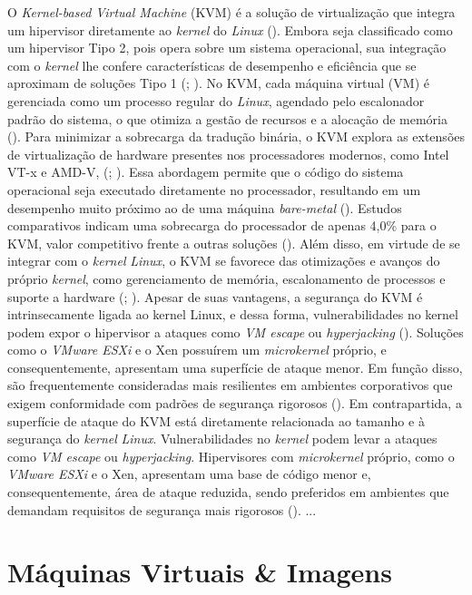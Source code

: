 \begin{itemize}
O \textit{Kernel-based Virtual Machine} (KVM) é a solução de virtualização que integra um hipervisor diretamente ao \textit{kernel} do \textit{Linux} (\cite{carissimi2008}). Embora seja classificado como um hipervisor Tipo 2, pois opera sobre um sistema operacional, sua integração com o \textit{kernel} lhe confere características de desempenho e eficiência que se aproximam de soluções Tipo 1 (\cite{chawla2025}; \cite{kominos2017}). No KVM, cada máquina virtual (VM) é gerenciada como um processo regular do \textit{Linux}, agendado pelo escalonador padrão do sistema, o que otimiza a gestão de recursos e a alocação de memória (\cite{anand2013}).
Para minimizar a sobrecarga da tradução binária, o KVM explora as extensões de virtualização de hardware presentes nos processadores modernos, como Intel VT-x e AMD-V, (\cite{chawla2025}; \cite{carissimi2008}). Essa abordagem permite que o código do sistema operacional seja executado diretamente no processador, resultando em um desempenho muito próximo ao de uma máquina \textit{bare-metal} (\cite{kominos2017}). Estudos comparativos indicam uma sobrecarga do processador de apenas 4,0\% para o KVM, valor competitivo frente a outras soluções (\cite{chawla2025}). Além disso, em virtude de se integrar com o \textit{kernel} \textit{Linux}, o KVM se favorece das otimizações e avanços do próprio \textit{kernel}, como gerenciamento de memória, escalonamento de processos e suporte a hardware (\cite{anand2013}; \cite{arora2014}).
Apesar de suas vantagens, a segurança do KVM é intrinsecamente ligada ao kernel Linux, e dessa forma, vulnerabilidades no kernel podem expor o hipervisor a ataques como \textit{VM escape} ou \textit{hyperjacking} (\cite{chawla2025}). Soluções como o \textit{VMware ESXi} e o Xen possuírem um \textit{microkernel} próprio, e consequentemente, apresentam uma superfície de ataque menor. Em função disso, são frequentemente consideradas mais resilientes em ambientes corporativos que exigem conformidade com padrões de segurança rigorosos (\cite{chawla2025}).
Em contrapartida, a superfície de ataque do KVM está diretamente relacionada ao tamanho e à segurança do \textit{kernel} \textit{Linux}. Vulnerabilidades no \textit{kernel} podem levar a ataques como \textit{VM escape} ou \textit{hyperjacking}. Hipervisores com \textit{microkernel} próprio, como o \textit{VMware ESXi} e o Xen, apresentam uma base de código menor e, consequentemente, área de ataque reduzida, sendo preferidos em ambientes que demandam requisitos de segurança mais rigorosos (\cite{chawla2025}).
{{ ... }}
\section{Máquinas Virtuais \& Imagens}


\end{itemize}
